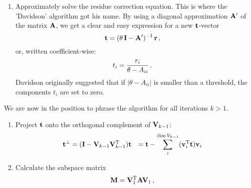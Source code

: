 \begin{enumerate}
            \item Approximately solve the residue correction equation. This is where the 'Davidson' algorithm got his name. By using a diagonal approximation $\vb{A}'$ of the matrix $\vb{A}$, we get a clear and easy expression for a new $\vb{t}$-vector
                \begin{equation}
                    \vb{t} = (\theta \thinspace \vb{I} - \vb{A}')^{-1} \thinspace \vb{r} \thinspace ,
                \end{equation}
                or, written coefficient-wise:
                \begin{equation}
                    t_i = \frac{r_i}{\theta - A_{ii}} \thinspace .
                \end{equation}
                Davidson originally suggested that if $|\theta - A_{ii}|$ is smaller than a threshold, the components $t_i$ are set to zero.
        \end{enumerate}

        We are now in the position to phrase the algorithm for all iterations $k>1$.

        \begin{enumerate}
            \item Project $\vb{t}$ onto the orthogonal complement of $\vb{V}_{k-1}$:
                \begin{align}
                    \vb{t}^{\perp} &= (\vb{I} - \vb{V}_{k-1} \vb{V}_{k-1}^{\text{T}}) \vb{t}
                    &= \vb{t} - \sum_i^{\dim{V_{k-1}}} (\vb{v}_i^{\text{T}} \vb{t}) \vb{v}_i
                \end{align}

            \item Calculate the subspace matrix
                \begin{equation}
                    \vb{M} = \vb{V}^{\text{T}}_1 \vb{A} \vb{V}_1 \thinspace ,
                \end{equation}
        \end{enumerate}









